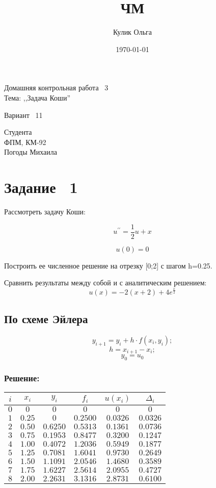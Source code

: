 \documentclass[a4paper,10pt,notitlepage,pdftex]{scrartcl}
\author{Кулик Ольга}
\title{ЧМ}
\date{\today}
\begin{document}
\thispagestyle{empty}
{
\LARGE

\vspace*{7cm}

\begin{center}
Домашняя контрольная работа \textnumero~3\\
Тема: ,,Задача Коши''

Вариант \textnumero~11\\
\end{center}

\vspace*{4cm}
\begin{flushright}
Студента\\
ФПМ, КМ-92\\
Погоды Михаила
\end{flushright}
}

\newpage

\section*{Задание \textnumero~1\\}

Рассмотреть задачу Коши:

$$u^{\prime\prime} = \frac{1}{2}u + x$$

$$ u(0) = 0$$

Построить ее численное решение на отрезку [0;2] с шагом h=0.25.

Сравнить результаты между собой и с аналитическим решением:
$$u(x)=-2(x+2)+4e^{\frac{x}{2}}$$

\subsection*{По схеме Эйлера}
$$y_{i+1} = y_i + h\cdot f(x_i,y_i);$$
$$h = x_{i+1} - x_i;$$
$$y_0 = u_0 $$
\subsubsection*{Решение:}
\begin{tabular}{|c|c|c|c|c|c|}
\hline
$i$	& $x_i$		& $y_i$		& $f_i$		& $u(x_i)$	& $\Delta_i$\\
\hline
$0$	& $0$		& $0$		& $0$		& $0$		& $0$\\
$1$	& $0.25$	& $0$		& $0.2500$	& $0.0326$	& $0.0326$\\
$2$	& $0.50$	& $0.6250$	& $0.5313$	& $0.1361$	& $0.0736$\\
$3$	& $0.75$	& $0.1953$	& $0.8477$	& $0.3200$	& $0.1247$\\
$4$	& $1.00$	& $0.4072$	& $1.2036$	& $0.5949$	& $0.1877$\\
$5$	& $1.25$	& $0.7081$	& $1.6041$	& $0.9730$	& $0.2649$\\
$6$	& $1.50$	& $1.1091$	& $2.0546$	& $1.4680$	& $0.3589$\\
$7$	& $1.75$	& $1.6227$	& $2.5614$	& $2.0955$	& $0.4727$\\
$8$	& $2.00$	& $2.2631$	& $3.1316$	& $2.8731$	& $0.6100$\\
\hline
\end{tabular}
\end{document}
